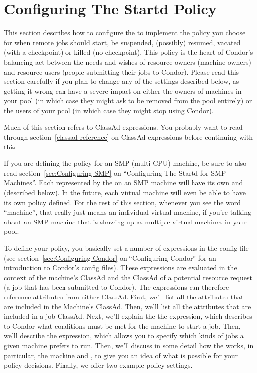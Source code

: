 \section{Configuring The Startd Policy}
\label{sec:Configuring-Policy}

This section describes how to configure the  to
implement the policy you choose for when remote jobs should start, be
suspended, (possibly) resumed, vacated (with a checkpoint) or killed
(no checkpoint).  This policy is the heart of Condor's balancing act
between the needs and wishes of resource owners (machine owners) and
resource users (people submitting their jobs to Condor).  Please read
this section carefully if you plan to change any of the settings
described below, as getting it wrong can have a severe impact on
either the owners of machines in your pool (in which case they might
ask to be removed from the pool entirely) or the users of your pool
(in which case they might stop using Condor).

Much of this section refers to ClassAd expressions.  You probably want
to read through section~\ref{classad-reference} on ClassAd expressions
before continuing with this.

\Note If you are defining the policy for an SMP (multi-CPU) machine,
be sure to also read section~\ref{sec:Configuring-SMP} on
``Configuring The Startd for SMP Machines''.  
Each  represented by the  on an
SMP machine will have its own  and 
(described below). 
In the future, each virtual machine will even be able to have its
own policy defined.
For the rest of this section, whenever you see the word ``machine'',
that really just means an individual virtual machine, if you're
talking about an SMP machine that is showing up as multiple virtual
machines in your pool.  

To define your policy, you basically set a number of expressions in
the config file (see section~\ref{sec:Configuring-Condor} on
``Configuring Condor'' for an introduction to Condor's config files).
These expressions are evaluated in the context of the machine's ClassAd
and the ClassAd of a potential resource request (a job that has been
submitted to Condor).
The expressions can therefore reference attributes from either
ClassAd. 
First, we'll list all the attributes that are included in the Machine's
ClassAd.
Then, we'll list all the attributes that are included in a job
ClassAd. 
Next, we'll explain the the  expression, which describes
to Condor what conditions must be met for the machine to start a job.
Then, we'll describe the  expression, which allows you to
specify which kinds of jobs a given machine prefers to run.
Then, we'll discuss in some detail how the  works, in
particular, the machine  and , to give
you an idea of what is possible for your policy decisions.
Finally, we offer two example policy settings.

